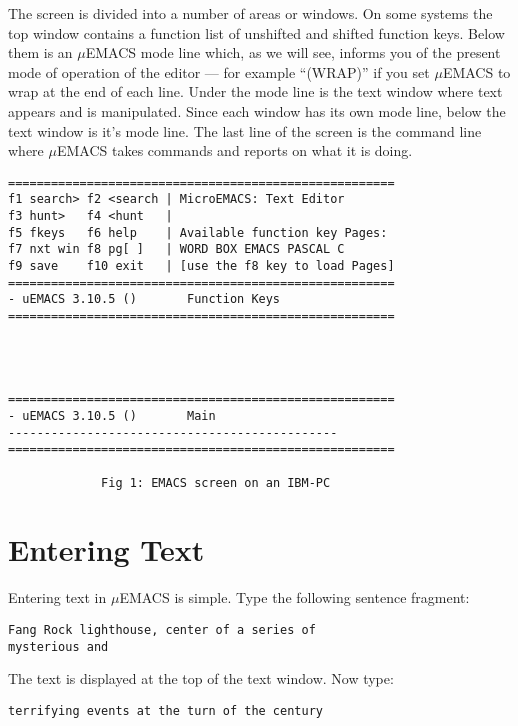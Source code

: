 The screen is divided into a number of areas or windows. On some
systems the top window contains a function list of unshifted and
shifted function keys. Below them is an $\mu$EMACS mode line which, as
we will see, informs you of the present mode of operation of the editor
--- for example ``(WRAP)'' if you set $\mu$EMACS to wrap at the end of
each line. Under the mode line is the text window where text appears
and is manipulated. Since each window has its own mode line, below the
text window is it's mode line. The last line of the screen is the
command line where $\mu$EMACS takes commands and reports on what it is
doing.

\begin{verbatim}
======================================================
f1 search> f2 <search | MicroEMACS: Text Editor
f3 hunt>   f4 <hunt   |
f5 fkeys   f6 help    | Available function key Pages:
f7 nxt win f8 pg[ ]   | WORD BOX EMACS PASCAL C
f9 save    f10 exit   | [use the f8 key to load Pages]
======================================================
- uEMACS 3.10.5 ()       Function Keys
======================================================




======================================================
- uEMACS 3.10.5 ()       Main
----------------------------------------------
======================================================

             Fig 1: EMACS screen on an IBM-PC
\end{verbatim}

\section{Entering Text}

Entering text in $\mu$EMACS is simple. Type the following sentence
fragment:

\begin{verbatim}
Fang Rock lighthouse, center of a series of
mysterious and
\end{verbatim}

The text is displayed at the top of the text window. Now type:

\begin{verbatim}
terrifying events at the turn of the century
\end{verbatim}


